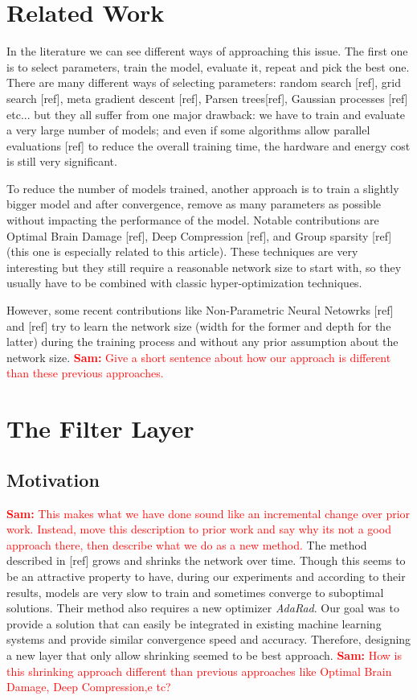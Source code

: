 \documentclass[sigconf]{acmart}
\newcommand{\srm}[1]{\textcolor{red}{{\bf Sam:} #1}}
\begin{document}
\section{Related Work}

\par In the literature we can see different ways of approaching this issue. The first one is to select parameters, train the model, evaluate it, repeat and pick the best one. There are many different ways of selecting parameters: random search [ref], grid search [ref], meta gradient descent [ref], Parsen trees[ref], Gaussian processes [ref] etc... but they all suffer from one major drawback: we have to train and evaluate a very large number of models; and even if some algorithms allow parallel evaluations [ref] to reduce the overall training time, the hardware and energy cost is still very significant.
\par To reduce the number of models trained, another approach is to train a slightly bigger model and after convergence, remove as many parameters as possible without impacting the performance of the model. Notable contributions are Optimal Brain Damage [ref], Deep Compression [ref], and Group sparsity [ref] (this one is especially related to this article). These techniques are very interesting but they still require a reasonable network size to start with, so they usually have to be combined with classic hyper-optimization techniques.
\par However, some recent contributions like Non-Parametric Neural Netowrks [ref] and [ref] try to learn the network size (width for the former and depth for the latter) during the training process and without any prior assumption about the network size.
\srm{Give a short sentence about how our approach is different than these previous approaches.}

\section{The Filter Layer}
\subsection{Motivation}

\srm{This makes what we have done sound like an incremental change over prior work.  Instead, move this description to prior work and say why its not a good approach there, then describe what we do as a new method.  }
The method described in [ref] grows and shrinks the network over time. Though this seems to be an attractive property to have, during our experiments and according to their results, models are very slow to train and sometimes converge to suboptimal solutions. Their method also requires a new optimizer \textit{AdaRad}. Our goal was to provide a solution that can easily be integrated in existing machine learning systems and provide similar convergence speed and accuracy. Therefore, designing a new layer that only allow shrinking seemed to be best approach.
\srm{How is this shrinking approach different than previous approaches like Optimal Brain Damage, Deep Compression,e tc?} 
\end{document}
